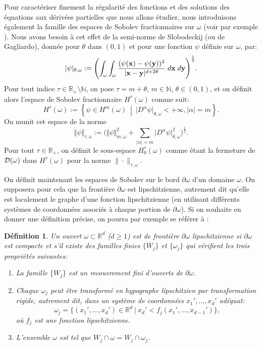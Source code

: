 \documentclass[11pt]{book}
\newtheorem{definition}[theorem]{Définition}
\newcommand{\bd}{\begin{definition}}
\newcommand{\ed}{\end{definition}}
\def\x{{\bf x}}
\def\y{{\bf y}}
\newcommand{\caD}{{\cal D}}
\newcommand{\R}{\mathbb{R}}
\newcommand{\N}{\mathbb{N}}
\begin{document}
Pour caractériser finement la régularité des fonctions et des solutions des équations aux dérivées partielles que nous allons étudier, nous introduisons également la famille 
des espaces de Sobolev fractionnaires sur $\omega$ (voir par exemple \cite{mclean-2000}).
Nous avons besoin à cet effet de la semi-norme de Slobodeckij (ou de Gagliardo), donnée pour $\theta$ dans $(0,1)$ et pour une fonction $\psi$ définie sur $\omega$, par:
\[
\vert \psi \vert_{\theta,\omega} :=
 \Biggl(\int_{\omega}\int_{\omega} {  \frac{(\psi(\x) -
 \psi({\y}))^2}{| \x-\y |^{d+2\theta}} } \; d\x \; d{\y}
 \Biggr)^{\frac12}.
\]
Pour tout indice $\tau \in {\R}_+\setminus {\N}$, on pose $\tau = m + \theta$, $m\in\N$, $\theta \in (0,1)$, et on définit alors l'espace de Sobolev fractionnaire $H^\tau(\omega)$ comme suit:
\[ 
H^{\tau}(\omega) :=
\left\{ \psi \in H^m(\omega) \:\middle|\: \vert D^\alpha \psi \vert_{\theta,\omega} < + \infty, \vert \alpha \vert = m \right\}.
\]
On munit cet espace de la norme
\[
\Vert \psi\Vert_{\tau,\omega} := \Biggl(\Vert \psi\Vert_{m,\omega}^2
  +
\sum_{ \vert\alpha\vert = m} \vert D^\alpha \psi \vert_{\theta,\omega}^2 \Biggr)^{\frac12}.
\]
Pour tout $\tau \in \R_+$, on définit le sous-espace $H^\tau_0 (\omega)$ comme étant la fermeture de $\caD (\omega)$ dans $H^\tau(\omega)$ pour la norme $\| \cdot \|_{\tau,\omega}$.

On définit maintenant les espaces de Sobolev sur le bord $\partial \omega$ d'un domaine $\omega$. On supposera pour cela que la frontière $\partial \omega$ est lipschitzienne, autrement dit qu'elle est localement le graphe d'une fonction lipschitzienne (en utilisant différents systèmes de coordonnées associés à chaque portion de $\partial \omega$). 
Si on souhaite en donner une définition précise, on pourra par exemple se référer à \cite[Definition 3.28, p.89]{mclean-2000}:

\bd Un ouvert $\omega \subset \R^d$ ($d\geq1$) est de frontière $\partial \omega$ lipschitzienne si $\partial \omega$ est compacte et s'il existe des familles finies $\{ W_j \}$ et $\{ \omega_j \}$ qui vérifient les trois propriétés suivantes:
\begin{enumerate}

\item La famille $\{ W_j \}$ est un recouvrement fini d'ouverts de $\partial \omega$.

\item Chaque $\omega_j$ peut être transformé en hypographe lipschitzien par transformation rigide, autrement dit, dans un système de coordonnées $x_1',\ldots,x_d'$ adéquat:
\[
\omega_j = \{ (x_1',\ldots,x_d') \in \R^d \:|\: x_d' < f_j ( x_1' , \ldots , x_{d-1}') \},
\] 
où $f_j$ est une fonction lipschitzienne.

\item L'ensemble $\omega$ est tel que $W_j \cap \omega = W_j \cap \omega_j$.

\end{enumerate}
\ed
\end{document}
